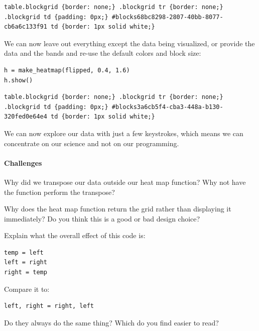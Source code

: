 \documentclass{book}
\begin{document}
\begin{verbatim}
table.blockgrid {border: none;} .blockgrid tr {border: none;} .blockgrid td {padding: 0px;} #blocks68bc8298-2807-40bb-8077-cb6a6c133f91 td {border: 1px solid white;}
\end{verbatim}

We can now leave out everything except the data being visualized, or
provide the data and the bands and re-use the default colors and block
size:

\begin{verbatim}
h = make_heatmap(flipped, 0.4, 1.6)
h.show()
\end{verbatim}

\begin{verbatim}
table.blockgrid {border: none;} .blockgrid tr {border: none;} .blockgrid td {padding: 0px;} #blocks3a6cb5f4-cba3-448a-b130-320fed0e64e4 td {border: 1px solid white;}
\end{verbatim}

We can now explore our data with just a few keystrokes, which means we
can concentrate on our science and not on our programming.

\mbox{}\paragraph{Challenges}

\begin{swcenumerate}
\item
  Why did we transpose our data outside our heat map function? Why not
  have the function perform the transpose?
\item
  Why does the heat map function return the grid rather than displaying
  it immediately? Do you think this is a good or bad design choice?
\item
  Explain what the overall effect of this code is:
\begin{verbatim}
temp = left
left = right
right = temp
\end{verbatim}
Compare it to:
\begin{verbatim}
left, right = right, left
\end{verbatim}
  Do they always do the same thing?
  Which do you find easier to read?
\end{swcenumerate}
\end{document}
